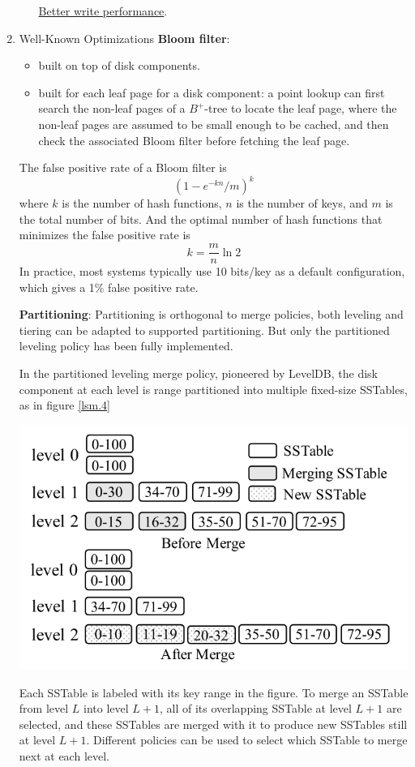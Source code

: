 \documentclass[11pt]{article}
\begin{document}
\begin{enumerate}
\begin{itemize}
\uline{Better write performance}.
\end{itemize}
\item Well-Known Optimizations
\label{sec:org0198a08}
\textbf{Bloom filter}:
\begin{itemize}
\item built on top of disk components.
\item built for each leaf page for a disk component: a point lookup can first search the non-leaf pages of
a \(B^+\)-tree to locate the leaf page, where the non-leaf pages are assumed to be small enough to
be cached, and then check the associated Bloom filter before fetching the leaf page.
\end{itemize}
The false positive rate of a Bloom filter is
\begin{equation*}
\left(1-e^{-kn}/m\right)^k
\end{equation*}
where \(k\) is the number of hash functions, \(n\) is the number of keys, and \(m\) is the total
number of bits. And the optimal number of hash functions that minimizes the false positive rate is
\begin{equation*}
k=\frac{m}{n}\ln 2
\end{equation*}
In practice, most systems typically use 10 bits/key as a default configuration, which gives a 1\% false
positive rate.

\textbf{Partitioning}: Partitioning is orthogonal to merge policies, both leveling and tiering can be adapted
to supported partitioning. But only the partitioned leveling policy has been fully implemented.

In the partitioned leveling merge policy, pioneered by LevelDB, the disk component at each level is
range partitioned into multiple fixed-size SSTables, as in figure \ref{lsm.4}
\begin{center}
\includegraphics[width=.8\textwidth]{../images/db/5.png}
\end{center}
Each SSTable is labeled with its key range in the figure. To merge an SSTable from level \(L\) into
level \(L+1\), all of its overlapping SSTable at level \(L+1\) are selected, and these SSTables are
merged with it to produce new SSTables still at level \(L+1\). Different policies can be used to
select which SSTable to merge next at each level.


\end{enumerate}
\end{document}
